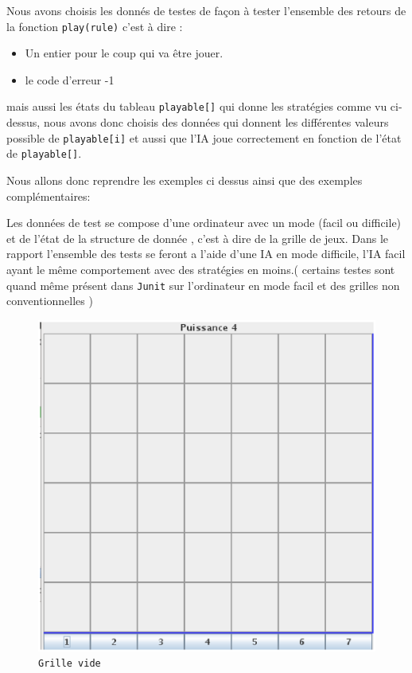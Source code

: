 
 Nous avons choisis les donnés de testes de façon à tester l'ensemble des retours de la fonction \texttt{play(rule)}
c'est à dire :
\begin{itemize}
 \item Un entier pour le coup qui va être jouer.
\item le code d'erreur -1
\end{itemize}

mais aussi les états du tableau \texttt{playable[]} qui donne les stratégies comme vu ci-dessus, nous avons donc choisis des données qui donnent les différentes valeurs possible de \texttt{playable[i]} et aussi que l'IA joue correctement en fonction de l'état de \texttt{playable[]}.

Nous allons donc reprendre les exemples ci dessus ainsi que des exemples complémentaires:

Les données de test se compose d'une ordinateur avec un mode (facil ou difficile) et de l'état de la structure de donnée , c'est à dire de la grille de jeux. Dans le rapport l'ensemble des tests se feront a l'aide d'une IA en mode difficile, l'IA facil ayant le même comportement avec des stratégies en moins.( certains testes sont quand même présent dans \texttt{Junit} sur l'ordinateur en mode facil et des grilles non conventionnelles )

\begin{figure}[H]
\begin{center}
  \includegraphics[scale=0.2]{nmfigempty}
  \caption{\texttt{Grille vide}}
\end{center}
\end{figure}

